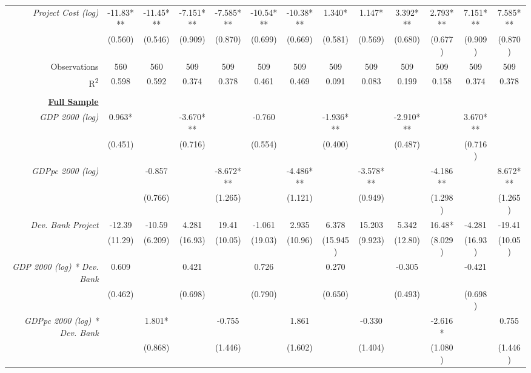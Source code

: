 \documentclass{article}
\begin{document}
\begin{singlespace}
\begin{landscape}
\begin{table}[H]
{\begin{tabular}{rcccccccccccc}
				\textit{Project Cost (log)} & -11.83*** & -11.45*** & -7.151*** & -7.585*** & -10.54*** & -10.38*** & 1.340* & 1.147* & 3.392*** & 2.793*** & 7.151*** & 7.585*** \\
				\textit{} & (0.560) & (0.546) & (0.909) & (0.870) & (0.699) & (0.669) & (0.581) & (0.569) & (0.680) & (0.677) & (0.909) & (0.870) \\ \hline
				Observations & 560 & 560 & 509 & 509 & 509 & 509 & 509 & 509 & 509 & 509 & 509 & 509 \\
				R\textsuperscript{2} & 0.598 & 0.592 & 0.374 & 0.378 & 0.461 & 0.469 & 0.091 & 0.083 & 0.199 & 0.158 & 0.374 & 0.378 \\ \hline
				\multicolumn{1}{l}{} & \multicolumn{1}{l}{} & \multicolumn{1}{l}{} & \multicolumn{1}{l}{} & \multicolumn{1}{l}{} & \multicolumn{1}{l}{} & \multicolumn{1}{l}{} & \multicolumn{1}{l}{} & \multicolumn{1}{l}{} & \multicolumn{1}{l}{} & \multicolumn{1}{l}{} & \multicolumn{1}{l}{} & \multicolumn{1}{l}{} \\
				{\ul \textbf{Full Sample}} &  &  &  &  &  &  &  &  &  &  &  &  \\
				\textit{GDP 2000 (log)} & 0.963* &  & -3.670*** &  & -0.760 &  & -1.936*** &  & -2.910*** &  & 3.670*** &  \\
				\textit{} & (0.451) &  & (0.716) &  & (0.554) &  & (0.400) &  & (0.487) &  & (0.716) &  \\
				\textit{GDPpc 2000 (log)} &  & -0.857 &  & -8.672*** &  & -4.486*** &  & -3.578*** &  & -4.186** &  & 8.672*** \\
				\textit{} &  & (0.766) &  & (1.265) &  & (1.121) &  & (0.949) &  & (1.298) &  & (1.265) \\
				\textit{Dev. Bank Project} & -12.39 & -10.59 & 4.281 & 19.41 & -1.061 & 2.935 & 6.378 & 15.203 & 5.342 & 16.48* & -4.281 & -19.41 \\
				\textit{} & (11.29) & (6.209) & (16.93) & (10.05) & (19.03) & (10.96) & (15.945) & (9.923) & (12.80) & (8.029) & (16.93) & (10.05) \\
				\textit{GDP 2000 (log) * Dev. Bank} & 0.609 &  & 0.421 &  & 0.726 &  & 0.270 &  & -0.305 &  & -0.421 &  \\
				\textit{} & (0.462) &  & (0.698) &  & (0.790) &  & (0.650) &  & (0.493) &  & (0.698) &  \\
				\textit{GDPpc 2000 (log) * Dev. Bank} &  & 1.801* &  & -0.755 &  & 1.861 &  & -0.330 &  & -2.616* &  & 0.755 \\
				\textit{} &  & (0.868) &  & (1.446) &  & (1.602) &  & (1.404) &  & (1.080) &  & (1.446) \\

\end{tabular}}
\end{table}
\end{landscape}
\end{singlespace}
\end{document}
